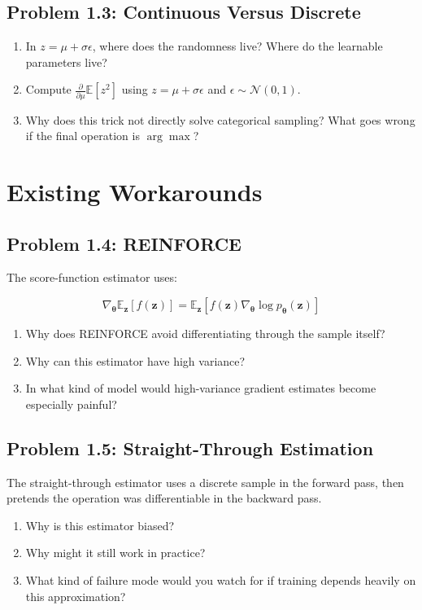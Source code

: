 \documentclass[11pt]{article}
\newcommand{\E}{\mathbb{E}}
\newcommand{\bz}{\mathbf{z}}
\newcommand{\btheta}{\boldsymbol{\theta}}
\begin{document}
\subsection*{Problem 1.3: Continuous Versus Discrete}

\begin{enumerate}[label=(\alph*)]
    \item In $z = \mu + \sigma\epsilon$, where does the randomness live? Where do the learnable parameters live?
    \item Compute $\frac{\partial}{\partial \mu}\E[z^2]$ using $z = \mu + \sigma\epsilon$ and $\epsilon \sim \mathcal{N}(0,1)$.
    \item Why does this trick not directly solve categorical sampling? What goes wrong if the final operation is $\arg\max$?
\end{enumerate}

\section{Existing Workarounds}

\subsection*{Problem 1.4: REINFORCE}

The score-function estimator uses:

\[
\nabla_{\btheta} \E_{\bz}[f(\bz)] = \E_{\bz}\left[f(\bz)\nabla_{\btheta}\log p_{\btheta}(\bz)\right]
\]

\begin{enumerate}[label=(\alph*)]
    \item Why does REINFORCE avoid differentiating through the sample itself?
    \item Why can this estimator have high variance?
    \item In what kind of model would high-variance gradient estimates become especially painful?
\end{enumerate}

\subsection*{Problem 1.5: Straight-Through Estimation}

The straight-through estimator uses a discrete sample in the forward pass, then pretends the operation was differentiable in the backward pass.

\begin{enumerate}[label=(\alph*)]
    \item Why is this estimator biased?
    \item Why might it still work in practice?
    \item What kind of failure mode would you watch for if training depends heavily on this approximation?
\end{enumerate}
\end{document}
